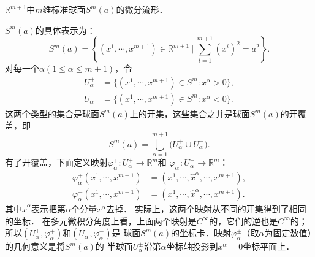 \begin{example}\label{chdm:exm_sphere1}
    $\mathbb{R}^{m+1}$中$m$维标准球面$S^m(a)$的微分流形．
\end{example}
$S^m(a)$的具体表示为：
\begin{equation}
    S^m(a)=\left\{(x^1, \cdots, x^{m+1}) \in \mathbb{R}^{m+1} \ | \ \sum_{i=1}^{m+1}(x^i)^2= a^2 \right\} .
\end{equation}
对每一个$\alpha(1\leqslant \alpha \leqslant m+1)$，令
\begin{align*}
    U_\alpha ^{+} &= \{(x^1,\cdots,x^{m+1})\in S^m: x^\alpha > 0 \},  \\
    U_\alpha ^{-} &= \{(x^1,\cdots,x^{m+1})\in S^m: x^\alpha < 0 \}.
\end{align*}
这两个类型的集合是球面$S^m(a)$上的开集，这些集合之并是球面$S^m(a)$的开覆盖，即
\begin{equation}
    S^m(a)= \bigcup_{\alpha=1}^{m+1} \bigl(U_\alpha ^{+} \cup U_\alpha ^{-} \bigr).
\end{equation}
有了开覆盖，下面定义映射$\varphi_\alpha ^{+}: U_\alpha ^{+} \to \mathbb{R}^m$和
$\varphi_\alpha ^{-}: U_\alpha ^{-} \to \mathbb{R}^m$：
\begin{align}
    \varphi_\alpha ^{+}(x^1,\cdots,x^{m+1}) &= (x^1,\cdots,\hat{x}^\alpha, \cdots,x^{m+1}), \\
    \varphi_\alpha ^{-}(x^1,\cdots,x^{m+1}) &= (x^1,\cdots,\hat{x}^\alpha, \cdots,x^{m+1}).
\end{align}
其中$\hat{x}^\alpha$表示把第$\alpha$个分量${x}^\alpha$去掉．
实际上，这两个映射从不同的开集得到了相同的坐标．
在多元微积分角度上看，上面两个映射是$C^\infty$的，它们的逆也是$C^\infty$的；
所以$(U_\alpha ^{+}, \varphi_\alpha ^{+})$和$(U_\alpha ^{-}, \varphi_\alpha ^{-})$是
球面$S^m(a)$的坐标卡．映射$\varphi_\alpha ^{\pm}$（取$\alpha$为固定数值）的几何意义是将$S^m(a)$的
半球面$U_\alpha ^{\pm}$沿第$\alpha$坐标轴投影到$x^\alpha=0$坐标平面上．

